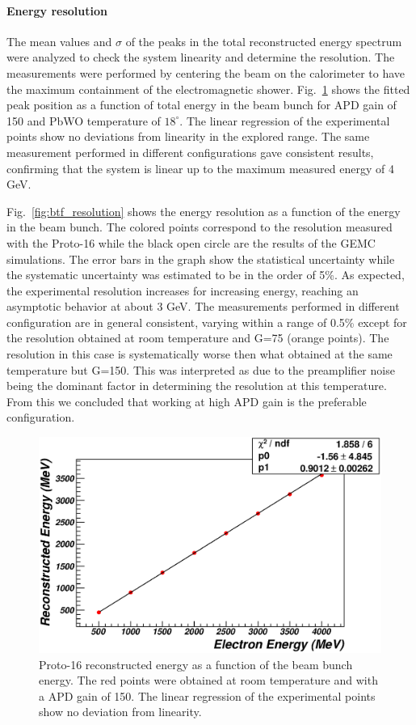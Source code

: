 \paragraph{Energy resolution}

The mean values and $\sigma$ of the peaks in the total reconstructed
energy spectrum were analyzed to check the system linearity and
determine the resolution. The measurements were performed by centering
the beam on the calorimeter to have the maximum containment of the
electromagnetic shower. 
Fig.~\ref{fig:btf_linearity} shows the fitted
peak position as a function of total energy in the beam bunch for APD
gain of 150 and PbWO temperature of $18^{\circ}$. The linear
regression of the experimental points show no deviations from
linearity in the explored range. The same measurement performed in
different configurations gave consistent results, confirming that the
system is linear up to the maximum measured energy of 4 GeV.

Fig.~\ref{fig:btf_resolution} shows the energy resolution as a
function of the energy in the beam bunch. The colored points
correspond to the resolution measured with the Proto-16 while the
black open circle are the results of the GEMC simulations. The error
bars in the graph show the statistical uncertainty while the
systematic uncertainty was estimated to be in the order of 5\%. 
As expected, the experimental resolution increases for increasing energy,
reaching an asymptotic behavior at about 3 GeV. The measurements
performed in different configuration are in general consistent,
varying within a range of 0.5\% except for the resolution obtained at
room temperature and G=75 (orange points).
The resolution in this case is systematically worse then what obtained
at the same temperature but G=150. This was interpreted as
due to the preamplifier noise being the dominant factor in determining
the resolution at this temperature. From this we concluded that
working at high APD gain is the preferable configuration. 
\begin{figure}
\includegraphics[width=1.0\columnwidth]{./fig/btf_linearity_1876_2_6.eps}
\caption{Proto-16 reconstructed energy as a function of the beam bunch
  energy. The red points were obtained at room temperature and with a
APD gain of 150. The linear regression of the experimental points show
no deviation from linearity.}
\label{fig:btf_linearity}
\end{figure}

